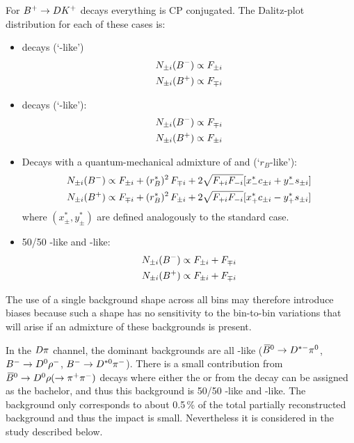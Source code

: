 For ${{{B}^+}}\rightarrow DK^+$ decays everything is CP conjugated. The Dalitz-plot distribution for each of these cases is:
\begin{itemize}
\item \Dz decays (`\Dz-like')
\begin{align}
\begin{split}
N_{\pm i}({{{B}^-}}) & \propto F_{\pm i} \label{eq:nD0} \\
N_{\pm i}({{{B}^+}}) & \propto F_{\mp i}
\end{split}
\end{align}
\item \Dzb decays (`\Dzb-like'):
\begin{align}{}
\begin{split}
N_{\pm i}({{{B}^-}}) & \propto F_{\mp i} \\
N_{\pm i}({{{B}^+}}) & \propto F_{\pm i}
\end{split}
\end{align}
\item Decays with a quantum-mechanical admixture of \Dz and \Dzb (`$r_B$-like'):
\begin{align}
\begin{split}
N_{\pm i}({{{B}^-}}) & \propto F_{\pm i} + (r_{B}^{*})^2\,F_{\mp i} + 2\sqrt{F_{+i}F_{-i}}[x_{-}^{*}c_{\pm i} + y_{-}^{*}s_{\pm i}] \\
N_{\pm i}({{{B}^+}}) & \propto F_{\mp i} + (r_{B}^{*})^2\,F_{\pm i} + 2\sqrt{F_{+i}F_{-i}}[x_{+}^{*}c_{\pm i} - y_{+}^{*}s_{\pm i}] \label{eq:nrB} 
\end{split}
\end{align}
where $(x_{\pm}^{*},y_{\pm}^{*})$ are defined analogously to the standard \BtoDK case.

\item 50/50 \Dz-like and \Dzb-like:
\begin{align}
\begin{split}
N_{\pm i}({{{B}^-}}) & \propto F_{\pm i} + F_{\mp i}  \\
N_{\pm i}({{{B}^+}}) & \propto F_{\pm i} + F_{\mp i}  \label{eq:n5050} 
\end{split}
\end{align}
\end{itemize}
The use of a single background shape across all bins may therefore introduce biases because such a shape has no sensitivity to the bin-to-bin variations that will arise if an  admixture of these backgrounds is present. 

In the ${D}\pi$ channel, the dominant backgrounds are all \Dz-like (${{\kern 0.18em\overline{\kern -0.18em B}}{}^0}\rightarrow{\ensuremath{{D}^{*-}}}{\ensuremath{{\pi}^0}}$, ${{{B}^-}}\rightarrow{\ensuremath{{D}^0}}\rho^-$, ${{{B}^-}}\rightarrow{\ensuremath{{D}^{*0}}}{\ensuremath{{\pi}^-}}$). There is a small contribution from ${{\kern 0.18em\overline{\kern -0.18em B}}{}^0}\rightarrow{\ensuremath{{D}^0}}\rho(\rightarrow{\ensuremath{{\pi}^+}}{\ensuremath{{\pi}^-}})$ decays where either the \pip or \pim from the \rhoz decay can be assigned as the bachelor, and thus this background is 50/50 \Dz-like and \Dzb-like. The background only corresponds to about 0.5\,\% of the total partially reconstructed background and thus the impact is small. Nevertheless it is considered in the study described below.

